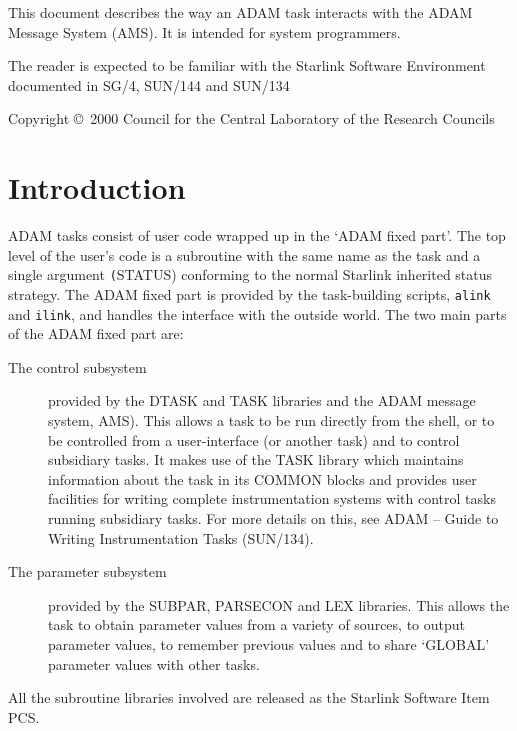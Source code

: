 \documentclass[twoside,11pt]{article}
\newcommand{\stardocinitials}  {SSN}
\newcommand{\stardoccopyright} 
{Copyright \copyright\ 2000 Council for the Central Laboratory of the Research Councils}
\newcommand{\stardocnumber}    {77.0}
\newcommand{\stardocabstract}  {This document describes the way an ADAM task
interacts with the ADAM Message System
(\xref{AMS}{sun241}{}).
It is intended for system programmers.

The reader is expected to be familiar with the Starlink Software Environment
documented in
\xref{SG/4}{sg4}{},
\xref{SUN/144}{sun144}{}
and
\xref{SUN/134}{sun134}{}}
\newcommand{\stardocname}{\stardocinitials /\stardocnumber}
\newenvironment{latexonly}{}{}
\newcommand{\latex}[1]{#1}
\newcommand{\xref}[3]{#1}
\renewcommand{\_}{\texttt{\symbol{95}}}
\renewcommand{\thepage}{\roman{page}}
\begin{document}
\stardocabstract

\begin{latexonly}
\newpage
\vspace*{\fill}
\stardoccopyright
\end{latexonly}

  \newpage
  \begin{latexonly}
    \setlength{\parskip}{0mm}
    \tableofcontents
    \setlength{\parskip}{\medskipamount}
    \markboth{\stardocname}{\stardocname}
  \end{latexonly}
\cleardoublepage
\renewcommand{\thepage}{\arabic{page}}
\setcounter{page}{1}

\section{Introduction}
ADAM tasks consist of user code wrapped up in the `ADAM fixed part'.
The top level of the user's code is a subroutine with the same name as the
task and a single argument \texttt(STATUS) conforming to 
\xref{the normal Starlink inherited status strategy}
{sun104}{inherited_status_checking}.
The ADAM fixed part is provided by the task-building scripts, 
\xref{\texttt{alink} and \texttt{ilink}}{sun144}{adam_link_scripts},
and handles the interface with the outside world. The two main parts of the
ADAM fixed part are:
\begin{description}
\item[The control subsystem]
provided by the DTASK and TASK libraries and the ADAM message system,
\xref{AMS}{sun241}{}).
This allows a task to be run directly from the shell, or to
be controlled from a user-interface (or another task) and to control
subsidiary tasks. It makes use of the TASK library which
maintains information about the task in its COMMON blocks and provides user
facilities for writing complete instrumentation systems with control tasks
running subsidiary tasks. For more details on this, see
\xref{ADAM -- Guide to Writing Instrumentation Tasks}{sun134}{}\latex{
(SUN/134)}.
\item[The parameter subsystem] provided by the SUBPAR, PARSECON and LEX
libraries. This allows the task to obtain parameter
values from a variety of sources, to output parameter values, to remember
previous values and to share `GLOBAL' parameter values with other tasks.
 \end{description}
All the subroutine libraries involved are released as the Starlink Software
Item
\xref{PCS}{ssn29}{}.
\end{document}
